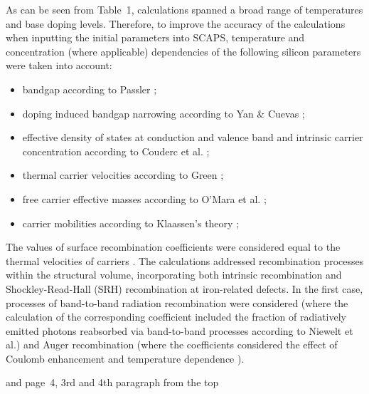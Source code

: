 \documentclass[a4paper,fleqn]{cas-sc}
\begin{document}
\begin{mdframed}
As can be seen from Table~1, calculations spanned a broad range of temperatures and base doping levels.
Therefore, to improve the accuracy of the calculations when inputting the initial parameters into SCAPS,
\textcolor[rgb]{1.00,0.07,0.00}{temperature and concentration (where applicable) dependencies of the following silicon parameters were taken into account}:

\begin{itemize}[itemsep=2pt, parsep=0pt, topsep=0pt]
    \item bandgap according to Passler \cite{Passler2002};
    \item doping induced bandgap narrowing according to Yan \& Cuevas \cite{EgNarrow};
    \item effective density of states at conduction and valence band and intrinsic carrier concentration according to Couderc et al. \cite{Si_ni_Couderc};
    \item thermal carrier velocities according to Green \cite{Nc:Green};
    \item free carrier effective masses according to O’Mara et al. \cite{OMara};
    \item carrier mobilities according to Klaassen's theory \cite{KLAASSEN953};
\end{itemize}

The values of surface recombination coefficients were considered equal to the thermal velocities of carriers \cite{Fell2015}.
The calculations addressed recombination processes within the structural volume,
incorporating both intrinsic recombination and Shockley-Read-Hall (SRH) recombination at iron-related defects.
In the first case, processes of band-to-band radiation recombination were considered
(where the calculation of the corresponding coefficient included the fraction of radiatively emitted photons
reabsorbed via band-to-band processes according to Niewelt et al.\cite{Brad2022})
and Auger recombination (where the coefficients considered the effect of Coulomb enhancement \cite{AugerSi2022} and
\textcolor[rgb]{1.00,0.07,0.00}{temperature dependence} \cite{Si_Auger}).
\end{mdframed}


and page~4, 3rd  and 4th paragraph from the top
\end{document}
